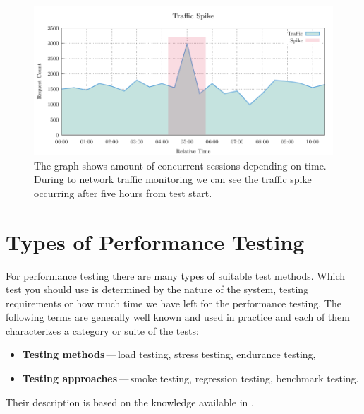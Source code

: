 \begin{figure}[H]
  \centering
  \includegraphics[width=14cm]{obrazky-figures/traffic_spike.pdf}
  \caption{The graph shows amount of concurrent sessions depending on time. During to network traffic monitoring we can see the traffic spike occurring after five hours from test start.}
  \label{fig:spikes}
\end{figure}

\section{Types of Performance Testing}
\label{Types of Performance Testing}

For performance testing there are many types of suitable test methods. Which test you should use is determined by the nature of the system, testing requirements or how much time we have left for the performance testing. The following terms are generally well known and used in practice and each of them characterizes a category or suite of the tests:
\begin{itemize}
	\item \textbf{Testing methods}\,---\,load testing, stress testing, endurance testing,
	\item \textbf{Testing approaches}\,---\,smoke testing, regression testing, benchmark testing.
\end{itemize}

Their description is based on the knowledge available in \cite{TuPo:TESTS, BUCH:4TYPES, Molyneaux:TAoAPT, ISTQB}.

